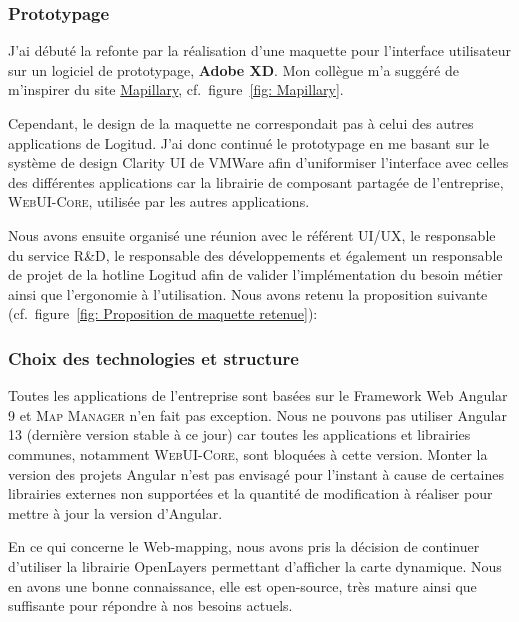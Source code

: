 \documentclass{rapportUHA40}
\begin{document}
\subsubsection{Prototypage}
J'ai débuté la refonte par la réalisation d'une maquette pour l'interface
utilisateur sur un logiciel de prototypage, \textbf{Adobe XD}. Mon collègue m'a
suggéré de m'inspirer du site \href{https://www.mapillary.com/app/}{Mapillary},
cf.\ figure~\ref{fig: Mapillary}.

Cependant, le design de la maquette ne correspondait pas à celui des autres
applications de Logitud. J'ai donc continué le prototypage en me basant sur le
système de design Clarity UI de VMWare afin d'uniformiser l'interface avec
celles des différentes applications car la librairie de composant partagée de
l'entreprise, \textsc{WebUI-Core}, utilisée par les autres applications.

Nous avons ensuite organisé une réunion avec le référent UI/UX, le responsable
du service R\&D, le responsable des développements et également un responsable
de projet de la hotline Logitud afin de valider l'implémentation du besoin
métier ainsi que l'ergonomie à l'utilisation. Nous avons retenu la proposition
suivante (cf.\ figure~\ref{fig: Proposition de maquette retenue}):

\subsubsection{Choix des technologies et structure}
Toutes les applications de l'entreprise sont basées sur le Framework Web
Angular 9 et \textsc{Map Manager} n'en fait pas exception. Nous ne pouvons pas
utiliser Angular 13 (dernière version stable à ce jour) car toutes les
applications et librairies communes, notamment \textsc{WebUI-Core}, sont
bloquées à cette version. Monter la version des projets Angular n'est pas
envisagé pour l'instant à cause de certaines librairies externes non supportées
et la quantité de modification à réaliser pour mettre à jour la version
d'Angular.

En ce qui concerne le Web-mapping, nous avons pris la décision de continuer
d'utiliser la librairie OpenLayers permettant d'afficher la carte dynamique.
Nous en avons une bonne connaissance, elle est open-source, très mature ainsi
que suffisante pour répondre à nos besoins actuels.
\end{document}
